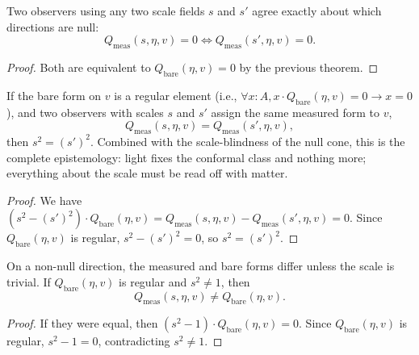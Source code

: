 \begin{theorem}
Two observers using any two scale fields $s$ and $s'$ agree exactly about which directions are null:
\begin{equation}
Q_{\text{meas}}(s, \eta, v) = 0 \iff Q_{\text{meas}}(s', \eta, v) = 0 .
\end{equation}
\end{theorem}

\begin{proof}
Both are equivalent to $Q_{\text{bare}}(\eta, v) = 0$ by the previous theorem.
\end{proof}

\begin{theorem}
If the bare form on $v$ is a regular element (i.e., $\forall x : A, x \cdot Q_{\text{bare}}(\eta, v) = 0 \to x = 0$), and two observers with scales $s$ and $s'$ assign the same measured form to $v$,
\begin{equation}
Q_{\text{meas}}(s, \eta, v) = Q_{\text{meas}}(s', \eta, v) ,
\end{equation}
then $s^2 = (s')^2$. Combined with the scale-blindness of the null cone, this is the complete epistemology: light fixes the conformal class and nothing more; everything about the scale must be read off with matter.
\end{theorem}

\begin{proof}
We have $(s^2 - (s')^2) \cdot Q_{\text{bare}}(\eta, v) = Q_{\text{meas}}(s, \eta, v) - Q_{\text{meas}}(s', \eta, v) = 0$. Since $Q_{\text{bare}}(\eta, v)$ is regular, $s^2 - (s')^2 = 0$, so $s^2 = (s')^2$.
\end{proof}

\begin{theorem}
On a non-null direction, the measured and bare forms differ unless the scale is trivial. If $Q_{\text{bare}}(\eta, v)$ is regular and $s^2 \neq 1$, then
\begin{equation}
Q_{\text{meas}}(s, \eta, v) \neq Q_{\text{bare}}(\eta, v) .
\end{equation}
\end{theorem}

\begin{proof}
If they were equal, then $(s^2 - 1) \cdot Q_{\text{bare}}(\eta, v) = 0$. Since $Q_{\text{bare}}(\eta, v)$ is regular, $s^2 - 1 = 0$, contradicting $s^2 \neq 1$.
\end{proof}

